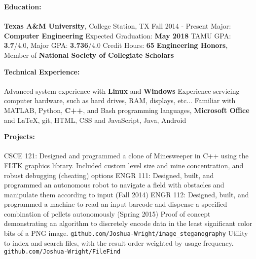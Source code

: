 \documentclass[12pt]{article}
\begin{document}
\begin{flushleft}
\begin{outline}[compactitem]

\newcommand{\upspace}{\vspace{0px}}
\newcommand{\zzz}[1]{\upspace \0 \textbf{#1} \\ \vspace{-0.8\baselineskip} \hrulefill \vspace{-2px} \\ }
\renewcommand\labelitemii{\labelitemi}
\let\oldOne\1\let\oldTwo\2\let\oldThree\3\let\oldFour\4
\renewcommand{\1}{\upspace \oldOne  }
\renewcommand{\2}{\upspace \oldTwo  }
\renewcommand{\3}{\upspace \oldThree}
\renewcommand{\4}{\upspace \oldFour }

\zzz{Education:}
  \1 \textbf{Texas A\&M University}, College Station, TX \hfill Fall 2014 - Present
    \2 Major: \textbf{Computer Engineering}
    \2 Expected Graduation: \textbf{May 2018}
    \2 TAMU GPA: \textbf{3.7}/4.0, Major GPA: \textbf{3.736}/4.0
    \2 Credit Hours: \textbf{65}
    \2 \textbf{Engineering Honors}, Member of \textbf{National Society of Collegiate Scholars}

\zzz{Technical Experience:}
  \1 Advanced system experience with \textbf{Linux} and \textbf{Windows}
  \1 Experience servicing computer hardware, such as hard drives, RAM, displays, etc...
  \1 Familiar with MATLAB, Python, \textbf{C++}, and Bash programming languages, 
  \textbf{Microsoft Office} and LaTeX, git, HTML, CSS and JavaScript, Java, Android

\zzz{Projects:}
  \1 CSCE 121: Designed and programmed a clone of Minesweeper in C++ using the FLTK graphics library. Included custom level size and mine concentration, and robust debugging (cheating) options
  \1 ENGR 111: Designed, built, and programmed an autonomous robot to navigate 
  a field with obstacles and manipulate them according to input (Fall 2014)
  \1 ENGR 112: Designed, built, and programmed a machine to read an input 
  barcode and dispense a specified combination of pellets autonomously (Spring 2015)
  \1 Proof of concept demonstrating an algorithm to discretely encode data in the least significant color bits of a PNG image.
    \verb|github.com/Joshua-Wright/image_steganography|
  \1 Utility to index and search files, with the result order weighted by usage frequency.
    \verb|github.com/Joshua-Wright/FileFind|


\end{outline}
\end{flushleft}
\end{document}
